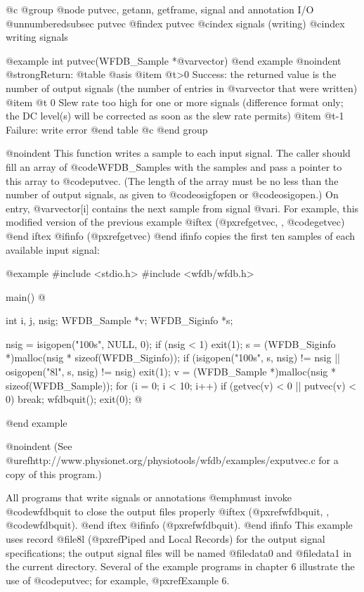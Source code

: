{{{{{{{{{@c @group
@node     putvec, getann, getframe, signal and annotation I/O
@unnumberedsubsec putvec
@findex putvec
@cindex signals (writing)
@cindex writing signals

@example
int putvec(WFDB_Sample *@var{vector})
@end example
@noindent
@strong{Return:}
@table @asis
@item @t{>0}
Success: the returned value is the number of output signals (the number
of entries in @var{vector} that were written)
@item @t{ 0}
Slew rate too high for one or more signals (difference format only; the
DC level(s) will be corrected as soon as the slew rate permits)
@item @t{-1}
Failure: write error
@end table
@c @end group

@noindent
This function writes a sample to each input signal.  The caller should fill an
array of @code{WFDB_Sample}s with the samples and pass a pointer to this array
to @code{putvec}.  (The length of the array must be no less than the number of
output signals, as given to @code{osigfopen} or @code{osigopen}.)  On entry,
@var{vector[i]} contains the next sample from signal @var{i}.  For example,
this modified version of the previous example
@iftex
(@pxref{getvec, , @code{getvec}})
@end iftex
@ifinfo
(@pxref{getvec})
@end ifinfo
copies the first ten samples of each available input signal:

@example
#include <stdio.h>
#include <wfdb/wfdb.h>

main()
@{
    int i, j, nsig;
    WFDB_Sample *v;
    WFDB_Siginfo *s;

    nsig = isigopen("100s", NULL, 0);
    if (nsig < 1)
        exit(1);
    s = (WFDB_Siginfo *)malloc(nsig * sizeof(WFDB_Siginfo));
    if (isigopen("100s", s, nsig) != nsig || 
        osigopen("8l", s, nsig) != nsig)
        exit(1);
    v = (WFDB_Sample *)malloc(nsig * sizeof(WFDB_Sample));
    for (i = 0; i < 10; i++)
        if (getvec(v) < 0 || putvec(v) < 0)
            break;
    wfdbquit();
    exit(0);
@}
@end example

@noindent
(See @uref{http://www.physionet.org/physiotools/wfdb/examples/exputvec.c}
for a copy of this program.)

All programs that write signals or annotations @emph{must} invoke
@code{wfdbquit} to close the output files properly
@iftex
(@pxref{wfdbquit, , @code{wfdbquit}}).
@end iftex
@ifinfo
(@pxref{wfdbquit}).
@end ifinfo
This example uses record @file{8l} (@pxref{Piped and Local Records}) for the
output signal specifications; the output signal files will be named
@file{data0} and @file{data1} in the current directory.  Several of the example
programs in chapter 6 illustrate the use of @code{putvec}; for example,
@pxref{Example 6}.

}}}}}}}}}
